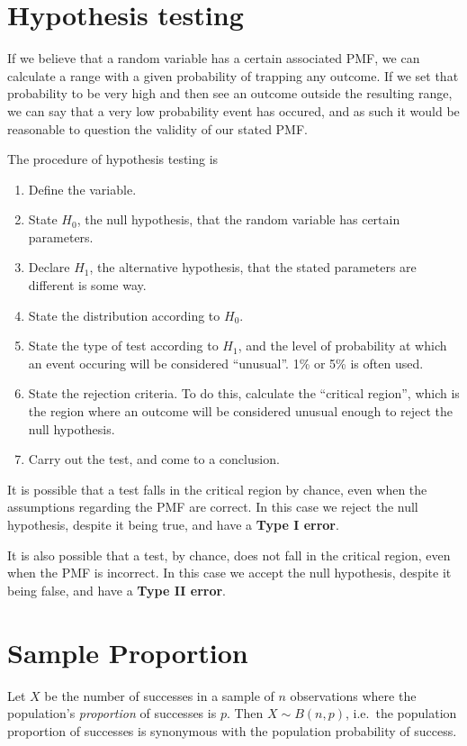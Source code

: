 \documentclass[a5paper]{article}
\begin{document}
\section{Hypothesis testing}

If we believe that a random variable has a certain associated PMF, we can
calculate a range with a given probability of trapping any outcome. If we set
that probability to be very high and then see an outcome outside the resulting
range, we can say that a very low probability event has occured, and as such it
would be reasonable to question the validity of our stated PMF.

The procedure of hypothesis testing is
\begin{enumerate}
  \item Define the variable.
\item State $H_0$, the null hypothesis, that the random variable has certain
  parameters.
\item Declare $H_1$, the alternative hypothesis, that the stated parameters are
  different is some way.
\item State the distribution according to $H_0$.
\item State the type of test according to $H_1$, and the level of probability
  at which an event occuring will be considered ``unusual''. 1\% or 5\% is
  often used.
\item State the rejection criteria. To do this, calculate the ``critical
  region'', which is the region where an outcome will be considered unusual
  enough to reject the null hypothesis.
\item Carry out the test, and come to a conclusion.
\end{enumerate}

It is possible that a test falls in the critical region by chance, even when the
assumptions regarding the PMF are correct. In this case we reject the null
hypothesis, despite it being true, and have a \textbf{Type I error}.

It is also possible that a test, by chance, does not fall in the critical
region, even when the PMF is incorrect. In this case we accept the null
hypothesis, despite it being false, and have a \textbf{Type II error}.

\section{Sample Proportion}

Let $X$ be the number of successes in a sample of $n$ observations where the
population's \textit{proportion} of successes is $p$. Then $X\sim B(n,p)$,
i.e.\ the population proportion of successes is synonymous with the population
probability of success.
\end{document}
